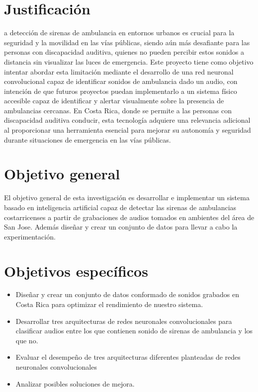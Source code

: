 \documentclass[conference, spanish, english]{IEEEtran}
\begin{document}
\section{Justificación}

a detección de sirenas de ambulancia en entornos urbanos es crucial para la seguridad y la movilidad en las vías públicas, siendo aún más desafiante para las personas con discapacidad auditiva, quienes no pueden percibir estos sonidos a distancia sin visualizar las luces de emergencia. Este proyecto tiene como objetivo intentar abordar esta limitación mediante el desarrollo de una red neuronal convolucional capaz de identificar sonidos de ambulancia dado un audio, con intención de que futuros proyectos puedan implementarlo a un sistema físico accesible capaz de identificar y alertar visualmente sobre la presencia de ambulancias cercanas. En Costa Rica, donde se permite a las personas con discapacidad auditiva conducir, esta tecnología adquiere una relevancia adicional al proporcionar una herramienta esencial para mejorar su autonomía y seguridad durante situaciones de emergencia en las vías públicas.

\section{Objetivo general}
El objetivo general de esta investigación es desarrollar e implementar un sistema basado en inteligencia artificial capaz de detectar las sirenas de ambulancias costarricenses a partir de grabaciones de audios tomados en ambientes del área de San Jose. Además diseñar y crear un conjunto de datos para llevar a cabo la experimentación.

\section{Objetivos específicos}

\begin{itemize}
 \item Diseñar y crear un conjunto de datos conformado de sonidos grabados en Costa Rica para optimizar el rendimiento de nuestro sistema.
 \item Desarrollar tres arquitecturas de redes neuronales convolucionales para clasificar audios entre los que contienen sonido de sirenas de ambulancia y los que no.
 \item Evaluar el desempeño de tres arquitecturas diferentes planteadas de redes neuronales convolucionales
 \item Analizar posibles soluciones de mejora.\\
\end{itemize}
\end{document}
